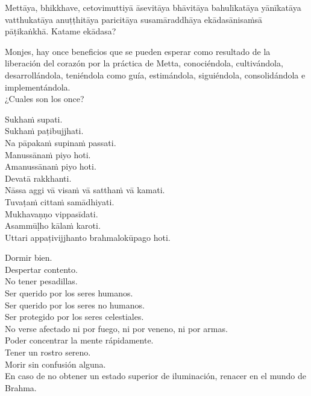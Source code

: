 \begin{leader}
\end{leader}

Mettāya, bhikkhave, cetovimuttiyā āsevitāya bhāvitāya bahulīkatāya yānīkatāya vatthukatāya anuṭṭhitāya paricitāya susamāraddhāya ekādasānisaṁsā pāṭikaṅkhā. Katame ekādasa?

\begin{english}
  Monjes, hay once beneficios que se pueden esperar como resultado de la liberación del corazón por la práctica de Metta, conociéndola, cultivándola, desarrollándola, teniéndola como guía, estimándola, siguiéndola, consolidándola e implementándola.\\
  ¿Cuales son los once?
\end{english}

Sukhaṁ supati.\\
Sukhaṁ paṭibujjhati.\\
Na pāpakaṁ supinaṁ passati.\\
Manussānaṁ piyo hoti.\\
Amanussānaṁ piyo hoti.\\
Devatā rakkhanti.\\
Nāssa aggi vā visaṁ vā satthaṁ vā kamati.\\
Tuvaṭaṁ cittaṁ samādhiyati.\\
Mukhavaṇṇo vippasīdati.\\
Asammūḷho kālaṁ karoti.\\
Uttari appaṭivijjhanto brahmalokūpago hoti.

\clearpage

\begin{english}
  Dormir bien.\\
  Despertar contento.\\
  No tener pesadillas.\\
  Ser querido por los seres humanos.\\
  Ser querido por los seres no humanos.\\
  Ser protegido por los seres celestiales.\\
  No verse afectado ni por fuego, ni por veneno, ni por armas.\\
  Poder concentrar la mente rápidamente.\\
  Tener un rostro sereno.\\
  Morir sin confusión alguna.\\
  En caso de no obtener un estado superior de iluminación, renacer en el mundo de Brahma.
\end{english}

